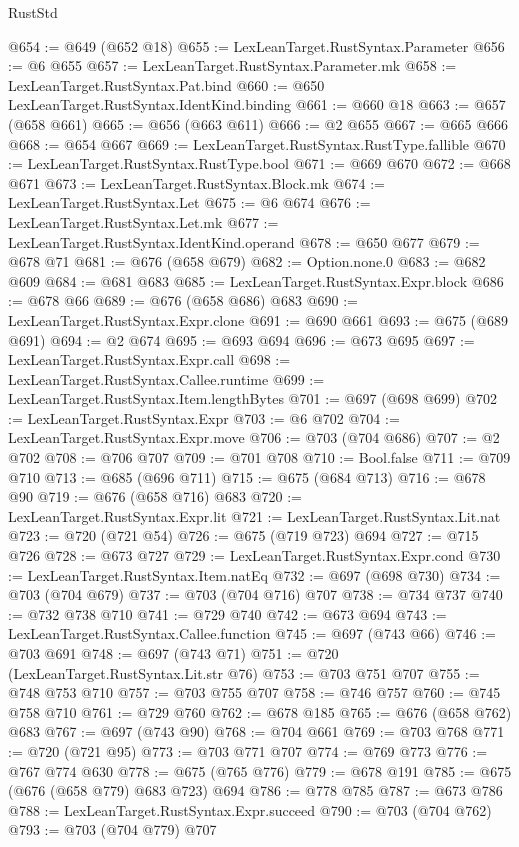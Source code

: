\begin{lexlean}{RustStd}
\begin{coremodule}
{\begin{coremodule}
{{{{{{{{{{{{@654 := @649 (@652 @18)
@655 := LexLeanTarget.RustSyntax.Parameter
@656 := @6 @655
@657 := LexLeanTarget.RustSyntax.Parameter.mk
@658 := LexLeanTarget.RustSyntax.Pat.bind
@660 := @650 LexLeanTarget.RustSyntax.IdentKind.binding
@661 := @660 @18
@663 := @657 (@658 @661)
@665 := @656 (@663 @611)
@666 := @2 @655
@667 := @665 @666
@668 := @654 @667
@669 := LexLeanTarget.RustSyntax.RustType.fallible
@670 := LexLeanTarget.RustSyntax.RustType.bool
@671 := @669 @670
@672 := @668 @671
@673 := LexLeanTarget.RustSyntax.Block.mk
@674 := LexLeanTarget.RustSyntax.Let
@675 := @6 @674
@676 := LexLeanTarget.RustSyntax.Let.mk
@677 := LexLeanTarget.RustSyntax.IdentKind.operand
@678 := @650 @677
@679 := @678 @71
@681 := @676 (@658 @679)
@682 := Option.none.{0}
@683 := @682 @609
@684 := @681 @683
@685 := LexLeanTarget.RustSyntax.Expr.block
@686 := @678 @66
@689 := @676 (@658 @686) @683
@690 := LexLeanTarget.RustSyntax.Expr.clone
@691 := @690 @661
@693 := @675 (@689 @691)
@694 := @2 @674
@695 := @693 @694
@696 := @673 @695
@697 := LexLeanTarget.RustSyntax.Expr.call
@698 := LexLeanTarget.RustSyntax.Callee.runtime
@699 := LexLeanTarget.RustSyntax.Item.lengthBytes
@701 := @697 (@698 @699)
@702 := LexLeanTarget.RustSyntax.Expr
@703 := @6 @702
@704 := LexLeanTarget.RustSyntax.Expr.move
@706 := @703 (@704 @686)
@707 := @2 @702
@708 := @706 @707
@709 := @701 @708
@710 := Bool.false
@711 := @709 @710
@713 := @685 (@696 @711)
@715 := @675 (@684 @713)
@716 := @678 @90
@719 := @676 (@658 @716) @683
@720 := LexLeanTarget.RustSyntax.Expr.lit
@721 := LexLeanTarget.RustSyntax.Lit.nat
@723 := @720 (@721 @54)
@726 := @675 (@719 @723) @694
@727 := @715 @726
@728 := @673 @727
@729 := LexLeanTarget.RustSyntax.Expr.cond
@730 := LexLeanTarget.RustSyntax.Item.natEq
@732 := @697 (@698 @730)
@734 := @703 (@704 @679)
@737 := @703 (@704 @716) @707
@738 := @734 @737
@740 := @732 @738 @710
@741 := @729 @740
@742 := @673 @694
@743 := LexLeanTarget.RustSyntax.Callee.function
@745 := @697 (@743 @66)
@746 := @703 @691
@748 := @697 (@743 @71)
@751 := @720 (LexLeanTarget.RustSyntax.Lit.str @76)
@753 := @703 @751 @707
@755 := @748 @753 @710
@757 := @703 @755 @707
@758 := @746 @757
@760 := @745 @758 @710
@761 := @729 @760
@762 := @678 @185
@765 := @676 (@658 @762) @683
@767 := @697 (@743 @90)
@768 := @704 @661
@769 := @703 @768
@771 := @720 (@721 @95)
@773 := @703 @771 @707
@774 := @769 @773
@776 := @767 @774 @630
@778 := @675 (@765 @776)
@779 := @678 @191
@785 := @675 (@676 (@658 @779) @683 @723) @694
@786 := @778 @785
@787 := @673 @786
@788 := LexLeanTarget.RustSyntax.Expr.succeed
@790 := @703 (@704 @762)
@793 := @703 (@704 @779) @707
}}}}}}}}}}}}
\end{coremodule}}
\end{coremodule}
\end{lexlean}
